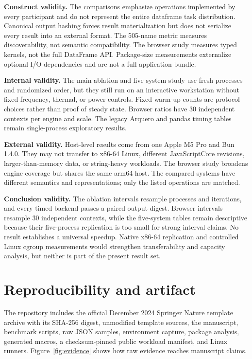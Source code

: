 \documentclass[pdflatex,sn-basic,Numbered]{sn-jnl}
\begin{document}
\textbf{Construct validity.} The comparisons emphasize operations implemented by every participant and do not represent the entire dataframe task distribution. Canonical output hashing forces result materialization but does not serialize every result into an external format. The 505-name metric measures discoverability, not semantic compatibility. The browser study measures typed kernels, not the full DataFrame API. Package-size measurements externalize optional I/O dependencies and are not a full application bundle.

\textbf{Internal validity.} The main ablation and five-system study use fresh processes and randomized order, but they still run on an interactive workstation without fixed frequency, thermal, or power controls. Fixed warm-up counts are protocol choices rather than proof of steady state. Browser ratios have 30 independent contexts per engine and scale. The legacy Arquero and pandas timing tables remain single-process exploratory results.

\textbf{External validity.} Host-level results come from one Apple M5 Pro and Bun 1.4.0. They may not transfer to x86-64 Linux, different JavaScriptCore revisions, larger-than-memory data, or string-heavy workloads. The browser study broadens engine coverage but shares the same arm64 host. The compared systems have different semantics and representations; only the listed operations are matched.

\textbf{Conclusion validity.} The ablation intervals resample processes and iterations, and every timed backend passes a paired output digest. Browser intervals resample 30 independent contexts, while the five-system tables remain descriptive because their five-process replication is too small for strong interval claims. No result establishes a universal speedup. Native x86-64 replication and controlled Linux cgroup measurements would strengthen transferability and capacity analysis, but neither is part of the present result set.

\section{Reproducibility and artifact}\label{sec:artifact}

The repository includes the official December 2024 Springer Nature template archive with its SHA-256 digest, unmodified template sources, the manuscript, benchmark scripts, raw JSON samples, environment capture, package analysis, generated macros, a checksum-pinned public workload manifest, and Linux runners. Figure~\ref{fig:evidence} shows how raw evidence reaches manuscript claims.
\end{document}
